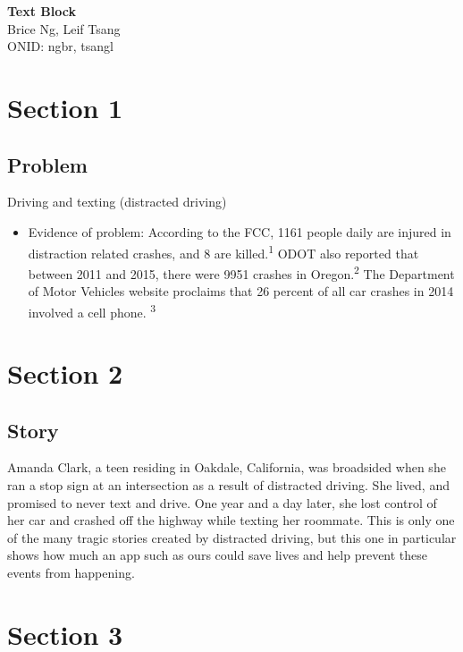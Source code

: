 \documentclass[12pt]{article}
\begin{document}
\begin {center}
\huge \textbf {Text Block}\\
Brice Ng, Leif Tsang\\
ONID: ngbr, tsangl
\\[2in]
\end{center}

\tableofcontents
\newpage
\section{Section 1}
	\subsection{Problem}
	 Driving and texting (distracted driving)
	\begin{itemize}
	\item Evidence of problem: According to the FCC, 1161 people daily are injured in distraction related crashes, and 8 are killed.\textsuperscript{1}  ODOT also reported that between 2011 	and 2015, there were 9951 crashes in Oregon.\textsuperscript{2}  The Department of Motor Vehicles website proclaims that 26 percent of all car crashes in 2014 involved a cell phone.	\textsuperscript{3}
\end{itemize}
\section{Section 2}
	\subsection{Story}
	\begin{flushleft}Amanda Clark, a teen residing in Oakdale, California, was broadsided when she ran a stop sign at an intersection as a result of distracted driving.  She lived, and promised to never text and drive.  One year and a day later, she lost control of her car and crashed off the highway while texting her roommate.  This is only one of the many tragic stories created by distracted driving, but this one in particular shows how much an app such as ours could save lives and help prevent these events from happening.\\
\end{flushleft}
\section{Section 3}
\end{document}
